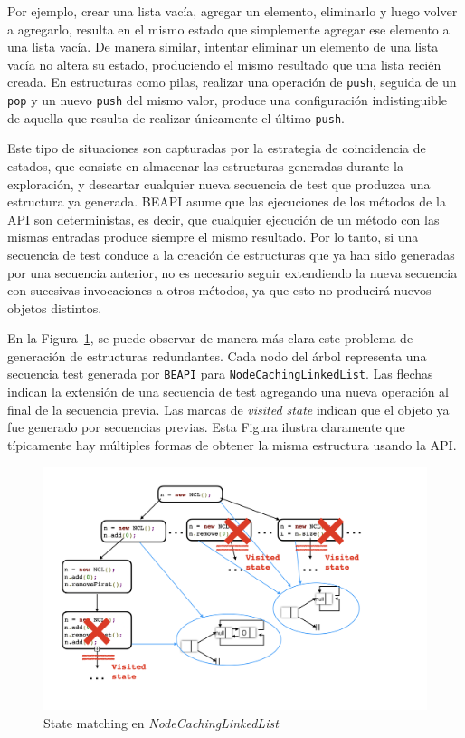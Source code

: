 Por ejemplo, crear una lista vacía, agregar un elemento, eliminarlo y luego volver a agregarlo, resulta en el mismo estado que simplemente agregar ese elemento a una lista vacía. 
De manera similar, intentar eliminar un elemento de una lista vacía no altera su estado, produciendo el mismo resultado que una lista recién creada. 
En estructuras como pilas, realizar una operación de \texttt{push}, seguida de un \texttt{pop} y un nuevo \texttt{push} del mismo valor, 
produce una configuración indistinguible de aquella que resulta de realizar únicamente el último \texttt{push}. 

Este tipo de situaciones son capturadas por la estrategia de coincidencia de
estados, que consiste en almacenar las estructuras generadas durante la
exploración, y descartar cualquier nueva secuencia de test que produzca una
estructura ya generada. 
\textsf{BEAPI} asume que las ejecuciones de los métodos de la API son
deterministas, es decir, que cualquier ejecución de un método con las mismas entradas produce 
siempre el mismo resultado. 
Por lo tanto, si una secuencia de test conduce a la creación de estructuras
que ya han sido generadas por una secuencia anterior, no es necesario seguir
extendiendo la nueva secuencia con sucesivas invocaciones a otros métodos, ya 
que esto no producirá nuevos objetos distintos.

En la Figura~\ref{fig:stateMatching}, se puede observar de manera más clara este
problema de generación de estructuras redundantes.
Cada nodo del árbol representa una secuencia test generada por \texttt{BEAPI}
para \texttt{NodeCachingLinkedList}. 
Las flechas indican la extensión de una secuencia de test agregando una nueva
operación al final de la secuencia previa.
Las marcas de \emph{visited state} indican que el objeto ya fue generado por
secuencias previas.
Esta Figura ilustra claramente que típicamente hay múltiples formas de obtener
la misma estructura usando la API.

\begin{figure}[H]
  \centering
  \includegraphics[width=1\textwidth]{images/stateMatching1.jpg}
  \caption{State matching en \emph{NodeCachingLinkedList}}
  \label{fig:stateMatching}
\end{figure}

